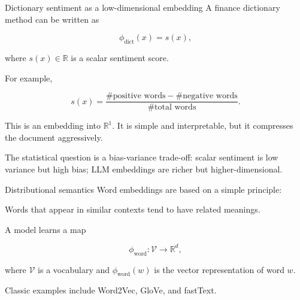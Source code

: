 \documentclass[aspectratio=169]{beamer}
\newcommand{\R}{\mathbb{R}}
\begin{document}
\begin{frame}{Dictionary sentiment as a low-dimensional embedding}
\large
A finance dictionary method can be written as

\[
\phi_{\text{dict}}(x) = s(x),
\]

where \(s(x) \in \R\) is a scalar sentiment score.

\vspace{0.25cm}

For example,

\[
s(x) = \frac{\#\text{positive words}-\#\text{negative words}}{\#\text{total words}}.
\]

\vspace{0.3cm}

This is an embedding into \(\R^1\). It is simple and interpretable, but it compresses the document aggressively.

\vspace{0.2cm}

\begin{bluebox}
The statistical question is a bias-variance trade-off: scalar sentiment is low variance but high bias; LLM embeddings are richer but higher-dimensional.
\end{bluebox}
\end{frame}

\begin{frame}{Distributional semantics}
\large
Word embeddings are based on a simple principle:

\vspace{0.25cm}

\begin{greenbox}
Words that appear in similar contexts tend to have related meanings.
\end{greenbox}

\vspace{0.35cm}

A model learns a map

\[
\phi_{\text{word}} : \mathcal{V} \to \R^d,
\]

where \(\mathcal{V}\) is a vocabulary and \(\phi_{\text{word}}(w)\) is the vector representation of word \(w\).

\vspace{0.25cm}

Classic examples include Word2Vec, GloVe, and fastText.
\end{frame}
\end{document}
